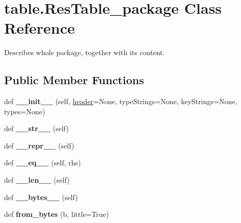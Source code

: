 \hypertarget{classtable_1_1ResTable__package}{}\section{table.\+Res\+Table\+\_\+package Class Reference}
\label{classtable_1_1ResTable__package}


Describes whole package, together with its content.  


\subsection*{Public Member Functions}
\begin{DoxyCompactItemize}
\item 
\mbox{\label{classtable_1_1ResTable__package_af07521318d0309b2f8338627344cc180}} 
def {\bfseries \+\_\+\+\_\+init\+\_\+\+\_\+} (self, \mbox{\hyperlink{classtable_1_1ResTable__package_a40423addcd543daa6b34f27a6199fd35}{header}}=None, type\+Strings=None, key\+Strings=None, types=None)
\item 
\mbox{\label{classtable_1_1ResTable__package_a29b5ec36256ee3403e95c324dbf58f65}} 
def {\bfseries \+\_\+\+\_\+str\+\_\+\+\_\+} (self)
\item 
\mbox{\label{classtable_1_1ResTable__package_a019f7143bfb7883c8bc6668196378059}} 
def {\bfseries \+\_\+\+\_\+repr\+\_\+\+\_\+} (self)
\item 
\mbox{\label{classtable_1_1ResTable__package_a15a3b684086dc6b10d496ca536b73a1b}} 
def {\bfseries \+\_\+\+\_\+eq\+\_\+\+\_\+} (self, rhs)
\item 
\mbox{\label{classtable_1_1ResTable__package_ae6cca04ae3a1776361249a1cde07da73}} 
def {\bfseries \+\_\+\+\_\+len\+\_\+\+\_\+} (self)
\item 
\mbox{\label{classtable_1_1ResTable__package_a88b94699fcbd81712862a73e88e85278}} 
def {\bfseries \+\_\+\+\_\+bytes\+\_\+\+\_\+} (self)
\item 
\mbox{\label{classtable_1_1ResTable__package_a09bb1e3d70d3b6bbeee28a96242ae46f}} 
def {\bfseries from\+\_\+bytes} (b, little=True)
\end{DoxyCompactItemize}

